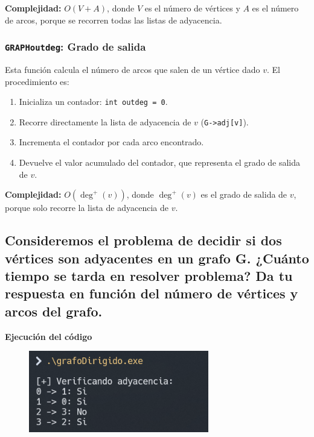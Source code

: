 \documentclass{article}
\begin{document}
            \textbf{Complejidad:} \( O(V + A) \), donde \( V \) es el número de vértices y \( A \) es el número de arcos, porque se recorren todas las listas de adyacencia.
        
        \subsubsection*{\texttt{GRAPHoutdeg}: Grado de salida}
            Esta función calcula el número de arcos que salen de un vértice dado \( v \). El procedimiento es:
            \begin{enumerate}
                \item Inicializa un contador: \texttt{int outdeg = 0}.
                \item Recorre directamente la lista de adyacencia de \( v \) (\texttt{G->adj[v]}).
                \item Incrementa el contador por cada arco encontrado.
                \item Devuelve el valor acumulado del contador, que representa el grado de salida de \( v \).
            \end{enumerate}
            
            \textbf{Complejidad:} \( O(\deg^+(v)) \), donde \( \deg^+(v) \) es el grado de salida de \( v \), porque solo recorre la lista de adyacencia de \( v \).


    \subsection{Consideremos el problema de decidir si dos vértices son adyacentes en un grafo G. ¿Cuánto tiempo se tarda en resolver problema? Da tu respuesta en función del número de vértices y arcos del grafo.}

        

        \textbf{Ejecución del código}
            \begin{figure}[H]
            	\centering
             	\includegraphics[width=0.7\textwidth,keepaspectratio]{img/exercise2.png}
            \end{figure}
\end{document}

